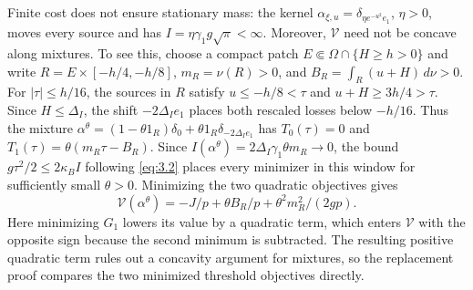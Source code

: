 \label{par:mixture-obstruction}
Finite cost does not ensure stationary mass: the kernel
\(\alpha_{\xi,u}=\delta_{\eta e^{-u^2}e_1}\), \(\eta>0\), moves every source and has
\(I=\eta\gamma_1g\sqrt\pi<\infty\).
Moreover, \(\mathcal V\) need not be concave along mixtures. To see this, choose a compact patch \(E\Subset\Omega\cap\{H\ge h>0\}\) and write
\(R=E\times[-h/4,-h/8]\), \(m_R=\nu(R)>0\), and
\(B_R=\int_R(u+H)\,d\nu>0\).
For \(|\tau|\le h/16\), the sources in \(R\) satisfy \(u\le-h/8<\tau\) and \(u+H\ge3h/4>\tau\). Since \(H\le\Delta_I\), the shift \(-2\Delta_Ie_1\) places both rescaled losses below \(-h/16\). Thus the mixture
\(\alpha^\theta=(1-\theta1_R)\delta_0+\theta1_R\delta_{-2\Delta_Ie_1}\)
has
\(T_0(\tau)=0\) and \(T_1(\tau)=\theta(m_R\tau-B_R)\).
Since \(I(\alpha^\theta)=2\Delta_I\gamma_1\theta m_R\to0\), the bound \(g\tau^2/2\le2\kappa_BI\) following \eqref{eq:3.2} places every minimizer in this window for sufficiently small \(\theta>0\). Minimizing the two quadratic objectives gives
\[
\mathcal V(\alpha^\theta)=-J/p+\theta B_R/p+\theta^2m_R^2/(2gp).
\]
Here minimizing \(G_1\) lowers its value by a quadratic term, which enters \(\mathcal V\) with the opposite sign because the second minimum is subtracted. The resulting positive quadratic term rules out a concavity argument for mixtures, so the replacement proof compares the two minimized threshold objectives directly.
